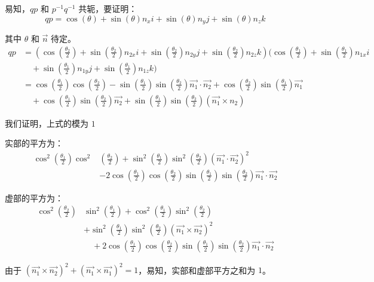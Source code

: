 \documentclass[withoutpreface,bwprint]{cumcmthesis} %
\begin{document}
易知，$qp$ 和 $p^{-1}q^{-1}$ 共轭，要证明：
\[
    qp = \cos(\theta) + \sin(\theta)n_xi + \sin(\theta)n_yj +
    \sin(\theta)n_zk
\]

其中 $\theta$ 和 $\overrightarrow{n}$ 待定。
\[
    \begin{split}
        qp &= (\cos(\frac{\theta _2}{2}) + \sin(\frac{\theta _2}{2})n_{2x}i
        + \sin(\frac{\theta _2}{2})n_{2y}j + \sin(\frac{\theta _2}{2})n_{2z}k)
        (\cos(\frac{\theta _1}{2}) + \sin(\frac{\theta _1}{2})n_{1x}i \\ &\quad +
        \sin(\frac{\theta _1}{2})n_{1y}j + \sin(\frac{\theta _1}{2})n_{1z}k) \\
        &= \cos(\frac{\theta _1}{2})\cos(\frac{\theta _2}{2}) - 
        \sin(\frac{\theta _1}{2})\sin(\frac{\theta _2}{2})\overrightarrow{n_1} 
        \cdot \overrightarrow{n_2} + \cos(\frac{\theta _2}{2})
        \sin(\frac{\theta _1}{2})\overrightarrow{n_1} \\&\quad + 
        \cos(\frac{\theta _1}{2})\sin(\frac{\theta _2}{2})\overrightarrow{n_2} +
        \sin(\frac{\theta _1}{2})\sin(\frac{\theta _2}{2})(\overrightarrow{n_1}
        \times n_2)
    \end{split}
\]

我们证明，上式的模为 $1$ \par
实部的平方为：
\begin{align*}
    \cos ^2(\frac{\theta _1}{2})\cos ^2&(\frac{\theta _2}{2}) +
    \sin ^2(\frac{\theta _1}{2})\sin ^2(\frac{\theta _2}{2})
    (\overrightarrow{n_1} \cdot \overrightarrow{n_2})^2 \\ &-
    2\cos(\frac{\theta _1}{2})\cos(\frac{\theta _2}{2})
    \sin(\frac{\theta _1}{2})\sin(\frac{\theta _2}{2})
    \overrightarrow{n_1} \cdot \overrightarrow{n_2} 
\end{align*}

虚部的平方为：
\begin{align*}
    \cos ^2(\frac{\theta _2}{2})&\sin ^2(\frac{\theta _1}{2}) +
    \cos ^2(\frac{\theta _1}{2})\sin ^2(\frac{\theta _2}{2}) \\ & +
    \sin ^2(\frac{\theta _1}{2})\sin ^2(\frac{\theta _2}{2})
    (\overrightarrow{n_1} \times \overrightarrow{n_2})^2 \\ &\quad +
    2\cos(\frac{\theta _1}{2})\cos(\frac{\theta _2}{2})
    \sin(\frac{\theta _1}{2})\sin(\frac{\theta _2}{2})
    \overrightarrow{n_1} \cdot \overrightarrow{n_2} 
\end{align*}

由于 $(\overrightarrow{n_1} \times \overrightarrow{n_2})^2 + (\overrightarrow{n_1} 
\times \overrightarrow{n_1})^2 = 1$，易知，实部和虚部平方之和为 $1$。
\end{document}
